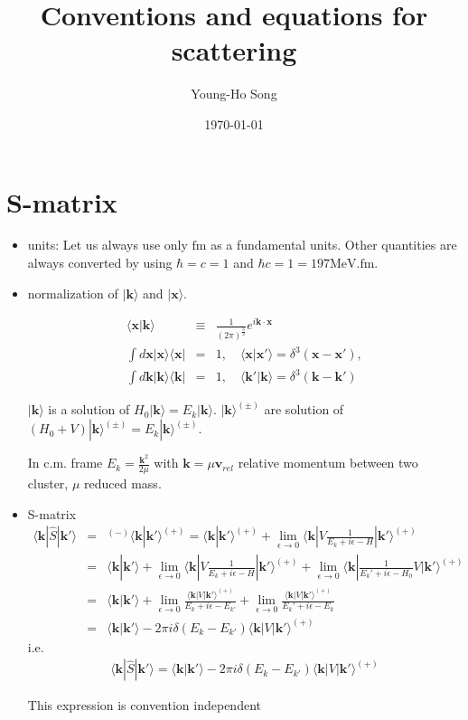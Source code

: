 \documentclass[10pt]{article}
\title{Conventions and equations for scattering}
\author{Young-Ho Song}
\date{\today}
\def\bm{\boldsymbol}
\newcommand{\bea}{\begin{eqnarray}}
\newcommand{\eea}{\end{eqnarray}}
\newcommand{\no}{\nonumber \\}
\def\vk{{\bm k}}
\def\vx{{\bm x}}
\def\la{\langle}
\def\ra{\rangle}
\begin{document}
\maketitle

\section{S-matrix}
\begin{itemize}

\item units: Let us always use only $\mbox{fm}$ as a fundamental units. Other quantities are always converted by using
$\hbar=c=1$ and $\hbar c=1=197 \mbox{MeV}.\mbox{fm}$.
\item normalization of $|\vk\ra$ and $|\vx\ra$.

\bea
\la \vx|\vk\ra&\equiv&\frac{1}{(2\pi)^\frac{3}{2}}e^{i\vk\cdot\vx}
\no
\int d\vx |\vx\ra \la \vx|&=&1, \quad \la \vx|\vx'\ra
=\delta^{3}(\vx-\vx'),\no 
\int d\vk |\vk\ra \la \vk|&=&1, \quad \la \vk'|\vk\ra=\delta^{3}(\vk-\vk')
\eea

$|\vk\ra$ is a solution of $H_0|\vk\ra=E_k|\vk\ra$.
$|\vk\ra^{(\pm)}$ are solution of $(H_0+V)|\vk\ra^{(\pm)}=E_k|\vk\ra^{(\pm)}$.

In c.m. frame $E_k=\frac{\vk^2}{2\mu}$
with $\vk=\mu {\bm v}_{rel}$ relative momentum
between two cluster, $\mu$ reduced mass.


\item S-matrix
\bea
\la \vk|\hat{S}|\vk'\ra
&=&{}^{(-)}\la\vk|\vk'\ra^{(+)}
=\la \vk|\vk'\ra^{(+)}
 +\lim_{\epsilon\to 0} \la \vk|V \frac{1}{E_k+ i\epsilon-H}|\vk'\ra^{(+)}\no
&=&\la \vk|\vk'\ra
 +\lim_{\epsilon\to 0} \la \vk|V \frac{1}{E_k+ i\epsilon-H}|\vk'\ra^{(+)}
 +\lim_{\epsilon\to 0} \la \vk|\frac{1}{E_k'+ i\epsilon-H_0}V|\vk'\ra^{(+)}\no
&=&\la \vk|\vk'\ra
 +\lim_{\epsilon\to 0}\frac{\la \vk|V |\vk'\ra^{(+)}}
                           {E_k+ i\epsilon-E_{k'}} 
 +\lim_{\epsilon\to 0}\frac{\la \vk|V|\vk'\ra^{(+)}}
                           {E_k'+ i\epsilon-E_k}   
\no
&=&\la \vk|\vk'\ra-2\pi i\delta(E_k-E_{k'})\la \vk|V|\vk'\ra^{(+)}
\eea
i.e.
\bea
\boxed{
\la \vk|\hat{S}|\vk'\ra=\la \vk|\vk'\ra-2\pi i\delta(E_k-E_{k'})\la \vk|V|\vk'\ra^{(+)}
}
\eea

This expression is convention independent


\end{itemize}
\end{document}
